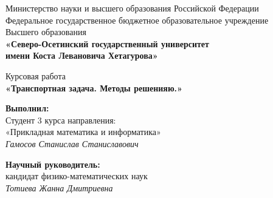 \documentclass[a4paper,12pt]{article}
\begin{document}
\setcounter{page}{0}
\renewcommand{\labelenumii}{\arabic{enumi}.\arabic{enumii}.}


\begin{center}
	\small{Министерство науки и высшего образования Российской Федерации}\\
	\small{Федеральное государственное бюджетное образовательное учреждение}\\
	\small{Высшего образования}\\
	\small{\textbf{«Северо-Осетинский государственный университет\\
			имени Коста Левановича Хетагурова»}}\\
		
	\hfill \break
	\hfill \break
	\hfill \break
	\hfill \break
	\hfill \break
	\hfill \break
	\hfill \break
	\hfill \break
	\hfill \break
	
	\normalsize{Курсовая работа}\\
	\large{\textbf{«Транспортная задача. Методы решенияю.»}}\\
	
	\hfill \break
	\hfill \break
	\hfill \break
	\hfill \break
	\hfill \break
	\hfill\break
\end{center}

\begin{flushright}
	\textbf{Выполнил:}\\
	Студент 3 курса направления:\\
	«Прикладная математика и информатика»\\
	\textit{Гамосов Станислав Станиславович}\\
\end{flushright}

\hfill

\begin{flushright}
	\textbf{Научный руководитель:}\\
	кандидат физико-математических наук\\
	\textit{Тотиева Жанна Дмитриевна}\\
\end{flushright}

\hfill
\end{document}
